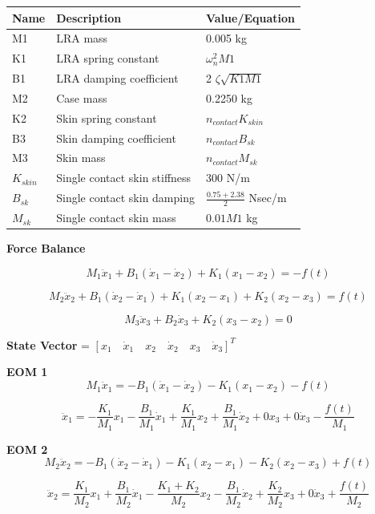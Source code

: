\documentclass[letterpaper,11pt]{article}
\begin{document}
\begin{table}[h]
\centering
\begin{tabular}{|l|l|l|}
\hline
\textbf{Name} & \textbf{Description} & \textbf{Value/Equation} \\
\hline
M1 & LRA mass & 0.005 kg \\
\hline
K1 & LRA spring constant & $\omega_n^2   M1$ \\
\hline
B1 & LRA damping coefficient & 2 $\zeta   \sqrt{K1   M1}$ \\
\hline
M2 & Case mass & 0.2250 kg \\
\hline
K2 & Skin spring constant & $n_{contact}   K_{skin}$ \\
\hline
B3 & Skin damping coefficient & $n_{contact}   B_{sk}$ \\
\hline
M3 & Skin mass & $n_{contact}   M_{sk}$ \\
\hline
$K_{skin}$ & Single contact skin stiffness & 300 N/m \\
\hline
$B_{sk}$ & Single contact skin damping & $\frac{0.75 + 2.38}{2}$ Nsec/m \\
\hline
$M_{sk}$ & Single contact skin mass & $0.01   M1$ kg \\
\hline
\end{tabular}
\end{table}


\noindent \textbf{Force Balance}

\[
M_1 \ddot{x}_1 + B_1(\dot{x}_1 - \dot{x}_2) + K_1(x_1 - x_2) = -f(t)
\]

\[
M_2 \ddot{x}_2 + B_1(\dot{x}_2 - \dot{x}_1) + K_1(x_2 - x_1) + K_2(x_2 - x_3) = f(t)
\]

\[
M_3 \ddot{x}_3 + B_2 \dot{x}_3 + K_2(x_3 - x_2) = 0
\]

\noindent \textbf{State Vector} = $[x_1 \quad \dot{x}_1 \quad x_2 \quad \dot{x}_2 \quad x_3 \quad \dot{x}_3]^T$

\noindent \textbf{EOM 1}
\[
M_1 \ddot{x}_1 = -B_1(\dot{x}_1 - \dot{x}_2) - K_1(x_1 - x_2) - f(t)
\]

\[
\ddot{x}_1 = -\frac{K_1}{M_1} x_1 - \frac{B_1}{M_1} \dot{x}_1 + \frac{K_1}{M_1} x_2 + \frac{B_1}{M_1} \dot{x}_2 + 0   x_3 + 0   \dot{x}_3 - \frac{f(t)}{M_1}
\]

\noindent \textbf{EOM 2}
\[
M_2 \ddot{x}_2 = -B_1(\dot{x}_2 - \dot{x}_1) - K_1(x_2 - x_1) - K_2(x_2 - x_3) + f(t)
\]

\[
\ddot{x}_2 = \frac{K_1}{M_2} x_1 + \frac{B_1}{M_2} \dot{x}_1 - \frac{K_1 + K_2}{M_2} x_2 - \frac{B_1}{M_2} \dot{x}_2 + \frac{K_2}{M_2} x_3 + 0   \dot{x}_3 + \frac{f(t)}{M_2}
\]
\end{document}
